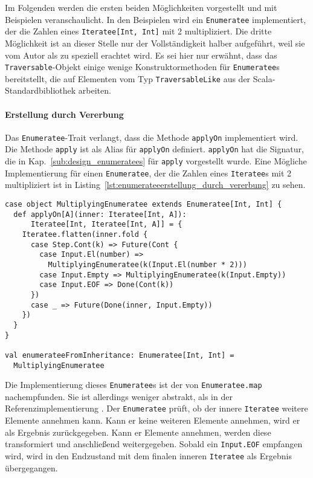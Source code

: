 Im Folgenden werden die ersten beiden Möglichkeiten vorgestellt und mit Beispielen veranschaulicht.
In den Beispielen wird ein \lstinline|Enumeratee| implementiert, der die Zahlen eines \lstinline|Iteratee[Int, Int]| mit 2 multipliziert.
Die dritte Möglichkeit ist an dieser Stelle nur der Vollständigkeit halber aufgeführt, weil sie vom Autor als zu speziell erachtet wird.
Es sei hier nur erwähnt, dass das \lstinline|Traversable|-Objekt einige wenige Konstruktormethoden für \lstinline|Enumeratee|s bereitstellt, die auf Elementen vom Typ \lstinline|TraversableLike| aus der Scala-Standardbibliothek arbeiten.

\paragraph{Erstellung durch Vererbung} %
\label{par:enumerateeerstellung_durch_vererbung}\mbox{} %

Das \lstinline|Enumeratee|-Trait verlangt, dass die Methode \lstinline|applyOn| implementiert wird.
Die Methode \lstinline|apply| ist als Alias für \lstinline|applyOn| definiert.
\lstinline|applyOn| hat die Signatur, die in Kap.~\ref{sub:design_enumeratees} für \lstinline|apply| vorgestellt wurde.
Eine Mögliche Implementierung für einen \lstinline|Enumeratee|, der die Zahlen eines \lstinline|Iteratee|s mit 2 multipliziert ist in Listing~\ref{lst:enumerateeerstellung_durch_vererbung} zu sehen.

\begin{lstlisting}[caption=Erstellung eines Enumeratees durch Vererbung, label=lst:enumerateeerstellung_durch_vererbung]
case object MultiplyingEnumeratee extends Enumeratee[Int, Int] {
  def applyOn[A](inner: Iteratee[Int, A]):
      Iteratee[Int, Iteratee[Int, A]] = {
    Iteratee.flatten(inner.fold {
      case Step.Cont(k) => Future(Cont {
        case Input.El(number) =>
          MultiplyingEnumeratee(k(Input.El(number * 2)))
        case Input.Empty => MultiplyingEnumeratee(k(Input.Empty))
        case Input.EOF => Done(Cont(k))
      })
      case _ => Future(Done(inner, Input.Empty))
    })
  }
}

val enumerateeFromInheritance: Enumeratee[Int, Int] =
  MultiplyingEnumeratee
\end{lstlisting}

Die Implementierung dieses \lstinline|Enumeratee|s ist der von \lstinline|Enumeratee.map| nachempfunden.
Sie ist allerdings weniger abstrakt, als in der Referenzimplementierung \cite[vgl.][Z.~268, Z.~174 und Z.~81]{play_enumeratee_source_code}.
Der \lstinline|Enumeratee| prüft, ob der innere \lstinline|Iteratee| weitere Elemente annehmen kann.
Kann er keine weiteren Elemente annehmen, wird er als Ergebnis zurückgegeben.
Kann er Elemente annehmen, werden diese transformiert und anschließend weitergegeben.
Sobald ein \lstinline|Input.EOF| empfangen wird, wird in den Endzustand mit dem finalen inneren \lstinline|Iteratee| als Ergebnis übergegangen.

